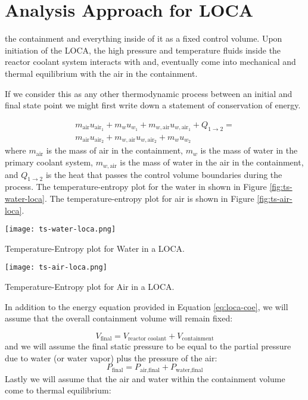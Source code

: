 \section{Analysis Approach for LOCA}

 the containment and everything inside of it as a fixed control volume.  Upon initiation of the LOCA, the high pressure and temperature fluids inside the reactor coolant system interacts with and, eventually come into mechanical and thermal equilibrium with the air in the containment.  

If we consider this as any other thermodynamic process between an initial and final state point we might first write down a statement of conservation of energy.  

\begin{multline}
m_{\text{air}}u_{\text{air}_1} + m_{w}u_{w_1} + m_{w,\text{air}}u_{w,\text{air}_1} + Q_{1 \rightarrow 2} = \\ m_{\text{air}}u_{\text{air}_2} + m_{w,\text{air}}u_{w,\text{air}_2} + m_w u_{w_2}
\label{eq:loca-coe}
\end{multline}
where $m_{\text{air}}$ is the mass of air in the containment, $m_{w}$ is the mass of water in the primary coolant system, $m_{w,\text{air}}$ is the mass of water in the air in the containment, and $Q_{1 \rightarrow 2}$ is the heat that passes the control volume boundaries during the process.  The temperature-entropy plot for the water in shown in Figure \ref{fig:ts-water-loca}.  The temperature-entropy plot for air is shown in Figure \ref{fig:ts-air-loca}.
\begin{marginfigure}
\texttt{[image: ts-water-loca.png]}
\caption{Temperature-Entropy plot for Water in a LOCA.}
\label{fig:ts-water-loca}
\end{marginfigure}

\begin{marginfigure}
\texttt{[image: ts-air-loca.png]}
\caption{Temperature-Entropy plot for Air in a LOCA.}
\label{fig:ts-air-loca}
\end{marginfigure}
In addition to the energy equation provided in Equation \ref{eq:loca-coe}, we will assume that the overall containment volume will remain fixed:

\begin{equation}
V_{\text{final}} = V_{\text{reactor coolant}} + V_{\text{containment}}
\label{eq:cov-loca}
\end{equation}
and we will assume the final static pressure to be equal to the partial pressure due to water (or water vapor) plus the pressure of the air:
\begin{equation}
P_{\text{final}} = P_{\text{air,final}} + P_{\text{water,final}}
\label{eq:cov-loca}
\end{equation}
Lastly we will assume that the air and water within the containment volume come to thermal equilibrium:

